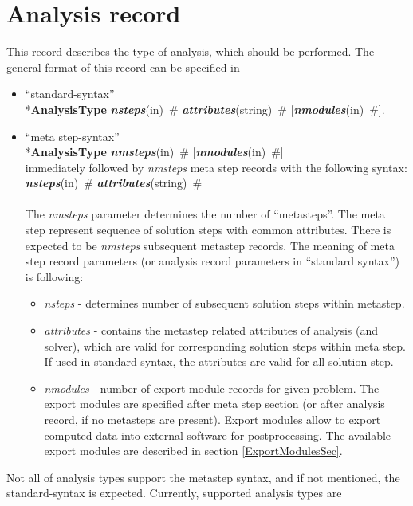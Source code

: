 \documentclass[draft]{article}
\newcommand{\param}[1]{{\em #1}}
\newcommand{\keywordnotype}[1]{\mbox{{\it{\bf{#1}}}}}
\newcommand{\keyword}[2]{\mbox{{\keywordnotype{#1}\tiny (#2)}}}
\newcommand{\entKeyword}[1]{\mbox{{*{\bf{#1}}}}}
\newcommand{\field}[2]{\mbox{\keyword{#1}{#2}~\#}}
\newcommand{\optField}[2]{\mbox{[\field{#1}{#2}]}}
\begin{document}
\section{Analysis record}
\label{_AnalysisRecord}
This record describes the type of analysis, which should be
performed. The general format of this record can be specified in 
\begin{itemize}
\item ``standard-syntax''\\
\entKeyword{AnalysisType} \field{nsteps}{in}
\field{attributes}{string} \optField{nmodules}{in}.
\item ``meta step-syntax''\\
\entKeyword{AnalysisType} \field{nmsteps}{in}
\optField{nmodules}{in}\\
immediately followed by \param{nmsteps} meta step records with the following syntax:\\
\field{nsteps}{in} \field{attributes}{string}\\\\
The \param{nmsteps} parameter determines the number of ``metasteps''. The
meta step represent sequence of solution steps with common attributes.
There is expected to be \param{nmsteps} subsequent metastep records.
The meaning of meta step record parameters (or analysis record
parameters in ``standard syntax'') is following:
\begin{itemize}
\item \param{nsteps} - determines number of subsequent solution steps
within me\-ta\-step.
\item \param{attributes} - contains the metastep related attributes of
analysis (and solver), which are valid for corresponding solution
steps within meta step. If used in standard syntax, the attributes are
valid for all solution step.
\item \param{nmodules} - number of export module records for given
problem. The export modules are specified after meta step section (or
after analysis record, if no metasteps are present). Export modules
allow to export computed data into external software for
postprocessing. The available export modules are described in section
\ref{ExportModulesSec}.

\end{itemize}

\end{itemize}
Not all of analysis types support the metastep syntax, and if 
not mentioned, the standard-syntax is expected.
Currently, supported analysis types are
\end{document}
